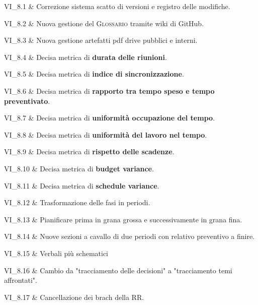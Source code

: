 VI\_8.1 & Correzione sistema scatto di versioni e registro delle modifiche.

\tabularnewline
VI\_8.2 & Nuova gestione del \textsc{Glossario} tramite wiki di GitHub.

\tabularnewline

VI\_8.3 & Nuova gestione artefatti pdf drive pubblici e interni.

\tabularnewline

VI\_8.4 & Decisa metrica di \textbf{durata delle riunioni}.

\tabularnewline

VI\_8.5 & Decisa metrica di \textbf{indice di sincronizzazione}.

\tabularnewline

VI\_8.6 & Decisa metrica di \textbf{rapporto tra tempo speso e tempo preventivato}.

\tabularnewline

VI\_8.7 & Decisa metrica di \textbf{uniformità occupazione del tempo}.

\tabularnewline

VI\_8.8 & Decisa metrica di \textbf{uniformità del lavoro nel tempo}.

\tabularnewline

VI\_8.9 & Decisa metrica di \textbf{rispetto delle scadenze}.

\tabularnewline

VI\_8.10 & Decisa metrica di \textbf{budget variance}.

\tabularnewline

VI\_8.11 & Decisa metrica di \textbf{schedule variance}.

\tabularnewline

VI\_8.12 & Trasformazione delle fasi in periodi.

\tabularnewline

VI\_8.13 & Pianificare prima in grana grossa e successivamente in grana fina.

\tabularnewline

VI\_8.14 & Nuove sezioni a cavallo di due periodi con relativo preventivo a finire.

\tabularnewline

VI\_8.15 & Verbali più schematici

\tabularnewline

VI\_8.16 & Cambio da "tracciamento delle decisioni" a "tracciamento temi affrontati".

\tabularnewline

VI\_8.17 & Cancellazione dei brach della RR.
